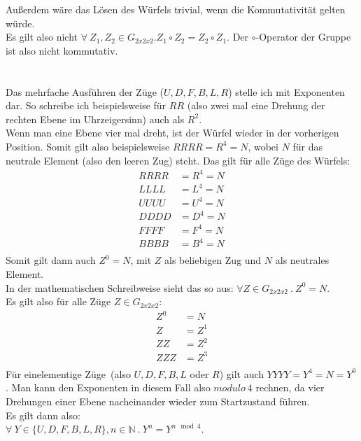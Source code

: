\documentclass[12pt,a4paper, usenames, dvipsnames]{article}
\begin{document}
Außerdem wäre das Lösen des Würfels trivial, wenn die Kommutativität gelten würde.\cite{TD} \\
Es gilt also nicht $\forall \  Z_1, Z_2 \in G_{2x2x2}. Z_1 \circ Z_2 = Z_2 \circ Z_1$. Der $\circ$-Operator der Gruppe ist also nicht kommutativ. \\
\\
\\
Das mehrfache Ausführen der Züge ($U, D, F, B, L, R$) stelle ich mit Exponenten dar. So schreibe ich beispielsweise für $RR$ (also zwei mal eine Drehung der rechten Ebene im Uhrzeigersinn) auch als $R^2$. \\
Wenn man eine Ebene vier mal dreht, ist der Würfel wieder in der vorherigen Position. Somit gilt also beispielsweise $RRRR=R^4=N$, wobei $N$ für das neutrale Element (also den leeren Zug) steht. Das gilt für alle Züge des Würfels:
\\
\begin{align*}
RRRR & =R^4 =N \\
LLLL & =L^4 =N \\
UUUU & =U^4 =N \\
DDDD & =D^4 =N \\
FFFF & =F^4 =N \\
BBBB & =B^4 =N \\
\end{align*}
Somit gilt dann auch $Z^0=N$, mit $Z$ als beliebigen Zug und $N$ als neutrales Element. \\
In der mathematischen Schreibweise sieht das so aus: $\forall Z \in G_{2x2x2} \ . \ Z^0=N$. \\
Es gilt also für alle Züge $Z \in G_{2x2x2}$: 
\begin{align*}
Z^0 & =N \\
Z & =Z^1 \\
ZZ & =Z^2 \\
ZZZ & =Z^3 \\
\end{align*}
Für \glqq einelementige Züge\grqq \  (also $U, D, F, B, L$ oder $R$) gilt auch $YYYY =Y^4=N=Y^0$.
Man kann den Exponenten in diesem Fall also $modulo \ 4$ rechnen, da vier Drehungen einer Ebene nacheinander wieder zum Startzustand führen. \\
Es gilt dann also: \\
$\forall \  Y \in \{U, D, F, B, L, R\}, n \in \mathbb{N} \ . \ Y^n=Y^{n \mod 4}$.
\newpage
\end{document}
